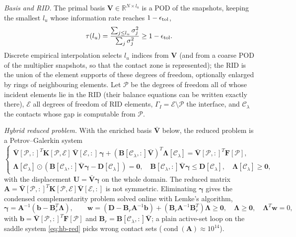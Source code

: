 \emph{Basis and RID.} The primal basis $\mathbf V\in\mathbb R^{N\times l_u}$ is a POD of the snapshots, keeping the smallest $l_u$ whose information rate reaches $1-\epsilon_{\rm tol}$,
\begin{equation}\label{eq:hb-rate}
\tau(l_u)=\frac{\sum_{j\le l_u}\sigma_j^2}{\sum_j\sigma_j^2}\ge1-\epsilon_{\rm tol}.
\end{equation}
Discrete empirical interpolation selects $l_u$ indices from $\mathbf V$ (and from a coarse POD of the multiplier snapshots, so that the contact zone is represented); the RID is the union of the element supports of these degrees of freedom, optionally enlarged by rings of neighbouring elements. Let $\mathcal P$ be the degrees of freedom all of whose incident elements lie in the RID (their balance equations can be written exactly there), $\mathcal E$ all degrees of freedom of RID elements, $\Gamma_I=\mathcal E\setminus\mathcal P$ the interface, and $\mathcal C_\lambda$ the contacts whose gap is computable from $\mathcal P$.

\emph{Hybrid reduced problem.} With the enriched basis $\bar{\mathbf V}$ below, the reduced problem is a Petrov--Galerkin system
\begin{equation}\label{eq:hb-red}
\begin{cases}
\bar{\mathbf V}[\mathcal P,:]^{T}\mathbf K[\mathcal P,\mathcal E]\,\bar{\mathbf V}[\mathcal E,:]\,\boldsymbol\gamma+(\mathbf B[\mathcal C_\lambda,:]\bar{\mathbf V})^{T}\boldsymbol\Lambda[\mathcal C_\lambda]=\bar{\mathbf V}[\mathcal P,:]^{T}\mathbf F[\mathcal P],\\[2pt]
\boldsymbol\Lambda[\mathcal C_\lambda]\odot(\mathbf B[\mathcal C_\lambda,:]\bar{\mathbf V}\boldsymbol\gamma-\mathbf D[\mathcal C_\lambda])=\mathbf 0,\quad
\mathbf B[\mathcal C_\lambda,:]\bar{\mathbf V}\boldsymbol\gamma\le\mathbf D[\mathcal C_\lambda],\quad\boldsymbol\Lambda[\mathcal C_\lambda]\ge\mathbf 0 ,
\end{cases}
\end{equation}
with the displacement $\mathbf U=\bar{\mathbf V}\boldsymbol\gamma$ on the whole domain. The reduced matrix $\mathbf A=\bar{\mathbf V}[\mathcal P,:]^{T}\mathbf K[\mathcal P,\mathcal E]\bar{\mathbf V}[\mathcal E,:]$ is not symmetric. Eliminating $\boldsymbol\gamma$ gives the condensed complementarity problem solved online with Lemke's algorithm,
\begin{equation}\label{eq:hb-lcp}
\boldsymbol\gamma=\mathbf A^{-1}(\mathbf b-\mathbf B_r^{T}\boldsymbol\Lambda),\qquad
\mathbf w=(\mathbf D-\mathbf B_r\mathbf A^{-1}\mathbf b)+(\mathbf B_r\mathbf A^{-1}\mathbf B_r^{T})\boldsymbol\Lambda\ge\mathbf 0,\quad\boldsymbol\Lambda\ge\mathbf 0,\quad\boldsymbol\Lambda^{T}\mathbf w=0,
\end{equation}
with $\mathbf b=\bar{\mathbf V}[\mathcal P,:]^{T}\mathbf F[\mathcal P]$ and $\mathbf B_r=\mathbf B[\mathcal C_\lambda,:]\bar{\mathbf V}$; a plain active-set loop on the saddle system \cref{eq:hb-red} picks wrong contact sets ($\operatorname{cond}(\mathbf A)\approx10^{14}$).

